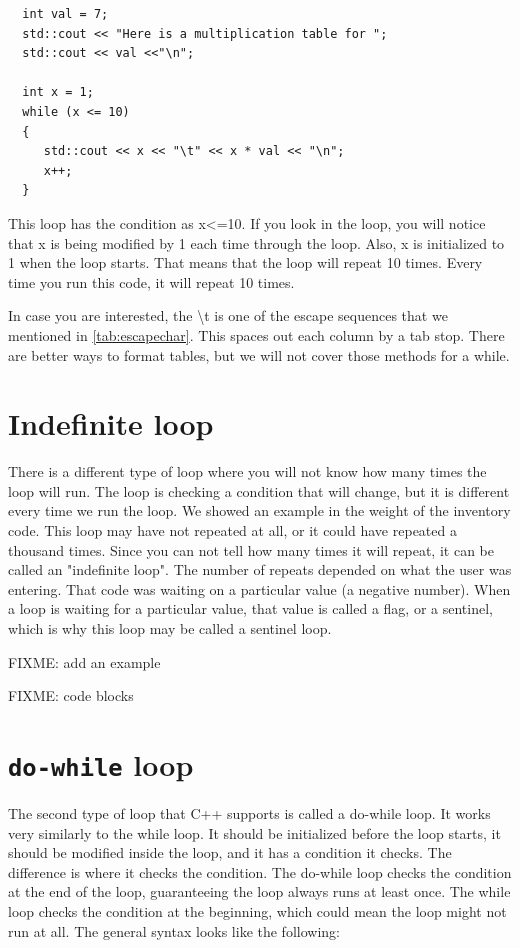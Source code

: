 \begin{lstlisting}
  int val = 7;
  std::cout << "Here is a multiplication table for ";
  std::cout << val <<"\n";
  
  int x = 1;
  while (x <= 10)
  {
     std::cout << x << "\t" << x * val << "\n";
     x++;
  }
\end{lstlisting}
This loop has the condition as x<=10. If you look in the loop, you will notice that
x is being modified by 1 each time through the loop. Also, x is initialized to 1
when the loop starts. That means that the loop will repeat 10 times. Every time you
run this code, it will repeat 10 times.

In case you are interested, the \textbackslash t is one of the escape sequences that
we mentioned in \ref{tab:escapechar}. This spaces out each column by a tab stop. There 
are better ways to format tables, but we will not cover those methods for a while.

\section{Indefinite loop}
There is a different type of loop where you will not know how many times the loop
will run. The loop is checking a condition that will change, but it is different every
time we run the loop. We showed an example in the weight of the inventory code. This 
loop may have not repeated at all, or it could have repeated a thousand times. Since
you can not tell how many times it will repeat, it can be called an "indefinite loop". 
The number of repeats depended on what the user was entering. That code was waiting on a particular value (a negative number).
When a loop is waiting for a particular value, that value is called a flag, or a sentinel, which is why this loop may be
called a sentinel loop. 

FIXME: add an example

FIXME: code blocks
\section{{\tt do-while} loop}
The second type of loop that C++ supports is called a do-while loop.
It works very similarly to the while loop. It should be initialized
before the loop starts, it should be modified inside the loop, and
it has a condition it checks. The difference is where it checks the
condition. The do-while loop checks the condition at the end of the
loop, guaranteeing the loop always runs at least once. The while loop
checks the condition at the beginning, which could mean the loop
might not run at all. The general syntax looks like the following:

